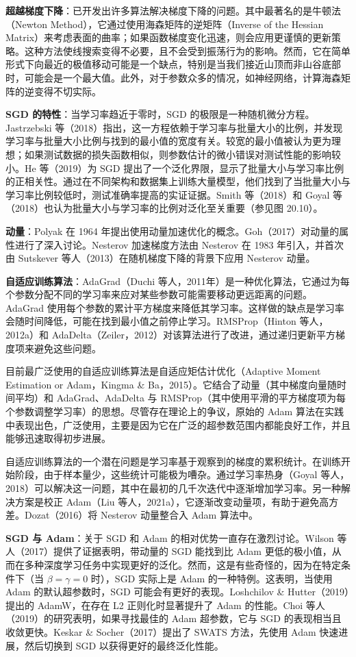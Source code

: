 \documentclass[lang=cn,newtx,10pt,scheme=chinese]{elegantbook}
\begin{document}
\textbf{超越梯度下降}：已开发出许多算法解决梯度下降的问题。其中最著名的是牛顿法（Newton Method），它通过使用海森矩阵的逆矩阵（Inverse of the Hessian Matrix）来考虑表面的曲率；如果函数梯度变化迅速，则会应用更谨慎的更新策略。这种方法使线搜索变得不必要，且不会受到振荡行为的影响。然而，它在简单形式下向最近的极值移动可能是一个缺点，特别是当我们接近山顶而非山谷底部时，可能会是一个最大值。此外，对于参数众多的情况，如神经网络，计算海森矩阵的逆变得不切实际。

\textbf{SGD 的特性}：当学习率趋近于零时，SGD 的极限是一种随机微分方程。Jastrzebski 等（2018）指出，这一方程依赖于学习率与批量大小的比例，并发现学习率与批量大小比例与找到的最小值的宽度有关。较宽的最小值被认为更为理想；如果测试数据的损失函数相似，则参数估计的微小错误对测试性能的影响较小。He 等（2019）为 SGD 提出了一个泛化界限，显示了批量大小与学习率比例的正相关性。通过在不同架构和数据集上训练大量模型，他们找到了当批量大小与学习率比例较低时，测试准确率提高的实证证据。Smith 等（2018）和 Goyal 等（2018）也认为批量大小与学习率的比例对泛化至关重要（参见图 20.10）。

\textbf{动量}：Polyak 在 1964 年提出使用动量加速优化的概念。Goh（2017）对动量的属性进行了深入讨论。Nesterov 加速梯度方法由 Nesterov 在 1983 年引入，并首次由 Sutskever 等人（2013）在随机梯度下降的背景下应用 Nesterov 动量。

\textbf{自适应训练算法}：AdaGrad（Duchi 等人，2011年）是一种优化算法，它通过为每个参数分配不同的学习率来应对某些参数可能需要移动更远距离的问题。AdaGrad 使用每个参数的累计平方梯度来降低其学习率。这样做的缺点是学习率会随时间降低，可能在找到最小值之前停止学习。RMSProp（Hinton 等人，2012a）和 AdaDelta（Zeiler，2012）对该算法进行了改进，通过递归更新平方梯度项来避免这些问题。

目前最广泛使用的自适应训练算法是自适应矩估计优化（Adaptive Moment Estimation or Adam，Kingma \& Ba，2015）。它结合了动量（其中梯度向量随时间平均）和 AdaGrad、AdaDelta 与 RMSProp（其中使用平滑的平方梯度项为每个参数调整学习率）的思想。尽管存在理论上的争议，原始的 Adam 算法在实践中表现出色，广泛使用，主要是因为它在广泛的超参数范围内都能良好工作，并且能够迅速取得初步进展。

自适应训练算法的一个潜在问题是学习率基于观察到的梯度的累积统计。在训练开始阶段，由于样本量少，这些统计可能极为嘈杂。通过学习率热身（Goyal 等人，2018）可以解决这一问题，其中在最初的几千次迭代中逐渐增加学习率。另一种解决方案是校正 Adam（Liu 等人，2021a），它逐渐改变动量项，有助于避免高方差。Dozat（2016）将 Nesterov 动量整合入 Adam 算法中。

\textbf{SGD 与 Adam}：关于 SGD 和 Adam 的相对优势一直存在激烈讨论。Wilson 等人（2017）提供了证据表明，带动量的 SGD 能找到比 Adam 更低的极小值，从而在多种深度学习任务中实现更好的泛化。然而，这是有些奇怪的，因为在特定条件下（当 \(\beta = \gamma = 0\) 时），SGD 实际上是 Adam 的一种特例。这表明，当使用 Adam 的默认超参数时，SGD 可能会有更好的表现。Loshchilov \& Hutter（2019）提出的 AdamW，在存在 L2 正则化时显著提升了 Adam 的性能。Choi 等人（2019）的研究表明，如果寻找最佳的 Adam 超参数，它与 SGD 的表现相当且收敛更快。Keskar \& Socher（2017）提出了 SWATS 方法，先使用 Adam 快速进展，然后切换到 SGD 以获得更好的最终泛化性能。
\end{document}
